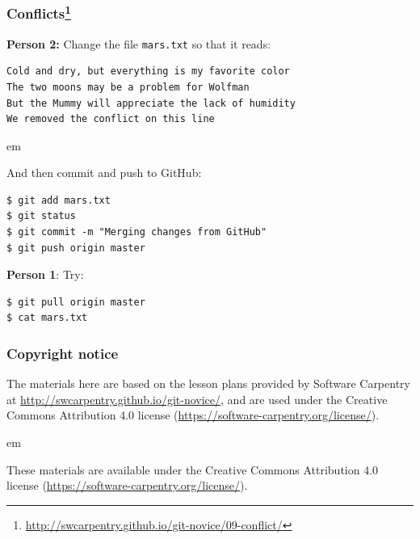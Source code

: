 \documentclass{beamer}
\begin{document}
\begin{frame}[fragile]
\frametitle{Conflicts\footnote{\url{http://swcarpentry.github.io/git-novice/09-conflict/}}}

\textbf{Person 2:} Change the file \texttt{mars.txt} so that it reads:
\begin{verbatim}
Cold and dry, but everything is my favorite color
The two moons may be a problem for Wolfman
But the Mummy will appreciate the lack of humidity
We removed the conflict on this line
\end{verbatim}

 em

And then commit and push to GitHub:
\begin{verbatim}
$ git add mars.txt
$ git status
$ git commit -m "Merging changes from GitHub"
$ git push origin master
\end{verbatim}

\pause

\textbf{Person 1}: Try:
\begin{verbatim}
$ git pull origin master
$ cat mars.txt
\end{verbatim}

\end{frame}

\begin{frame}
\end{frame}

\begin{frame}
\frametitle{Copyright notice}

The materials here are based on the lesson plans provided by Software Carpentry at \url{http://swcarpentry.github.io/git-novice/}, and are used under the Creative Commons Attribution 4.0 license (\url{https://software-carpentry.org/license/}).

 em

These materials are available under the Creative Commons Attribution 4.0 license (\url{https://software-carpentry.org/license/}).

\end{frame}
\end{document}
